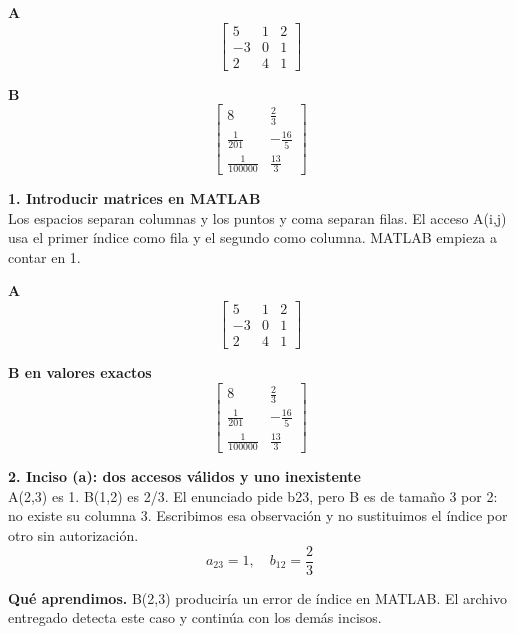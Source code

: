 \documentclass[11pt,a4paper,landscape]{article}
\begin{document}
\par\smallskip \begin{minipage}[t]{.47\linewidth}\centering \textbf{A}\[\begin{bmatrix}5 & 1 & 2\\-3 & 0 & 1\\2 & 4 & 1\end{bmatrix}\]\end{minipage}\hfill\begin{minipage}[t]{.47\linewidth}\centering \textbf{B}\[\begin{bmatrix}8 & \frac{2}{3}\\\frac{1}{201} & - \frac{16}{5}\\\frac{1}{100000} & \frac{13}{3}\end{bmatrix}\]\end{minipage}\par\smallskip
\par\medskip
\noindent\begin{minipage}{\linewidth}\textbf{1. Introducir matrices en MATLAB}\\[2pt]Los espacios separan columnas y los puntos y coma separan filas. El acceso A(i,j) usa el primer índice como fila y el segundo como columna. MATLAB empieza a contar en 1.
\par\smallskip \begin{minipage}[t]{.47\linewidth}\centering \textbf{A}\[\begin{bmatrix}5 & 1 & 2\\-3 & 0 & 1\\2 & 4 & 1\end{bmatrix}\]\end{minipage}\hfill\begin{minipage}[t]{.47\linewidth}\centering \textbf{B en valores exactos}\[\begin{bmatrix}8 & \frac{2}{3}\\\frac{1}{201} & - \frac{16}{5}\\\frac{1}{100000} & \frac{13}{3}\end{bmatrix}\]\end{minipage}\par\smallskip
\end{minipage}\par\medskip
\noindent\begin{minipage}{\linewidth}\textbf{2. Inciso (a): dos accesos válidos y uno inexistente}\\[2pt]A(2,3) es 1. B(1,2) es 2/3. El enunciado pide b23, pero B es de tamaño 3 por 2: no existe su columna 3. Escribimos esa observación y no sustituimos el índice por otro sin autorización.
\[a_{23}=1,\quad b_{12}=\frac{2}{3}\]
\par\smallskip\textbf{Qué aprendimos.} B(2,3) produciría un error de índice en MATLAB. El archivo entregado detecta este caso y continúa con los demás incisos.
\end{minipage}\par\medskip
\end{document}
